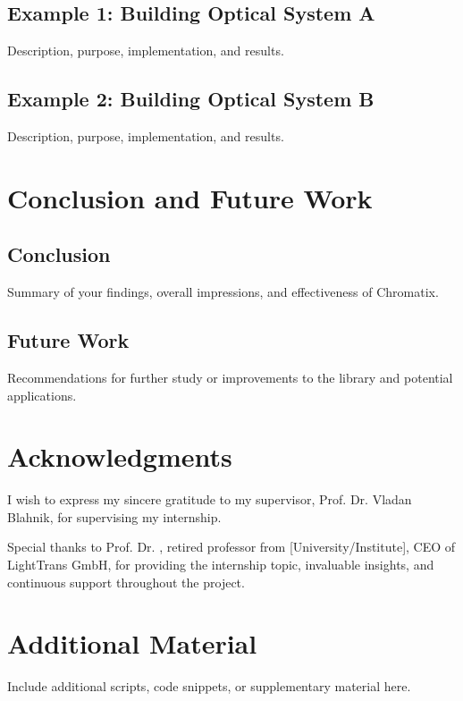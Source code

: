\documentclass[a4paper,12pt]{report}
\begin{document}
\section{Example 1: Building Optical System A}
Description, purpose, implementation, and results.

\section{Example 2: Building Optical System B}
Description, purpose, implementation, and results.

\chapter{Conclusion and Future Work}
\section{Conclusion}
Summary of your findings, overall impressions, and effectiveness of Chromatix.

\section{Future Work}
Recommendations for further study or improvements to the library and potential applications.

\chapter{Acknowledgments}
I wish to express my sincere gratitude to my supervisor, Prof. Dr. Vladan Blahnik, for supervising my internship. 

Special thanks to Prof. Dr. , retired professor from [University/Institute], CEO of LightTrans GmbH, for providing the internship topic, invaluable insights, and continuous support throughout the project. 






\appendix
\chapter{Additional Material}
Include additional scripts, code snippets, or supplementary material here.
\end{document}
